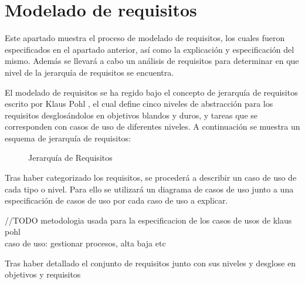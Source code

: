 \section{Modelado de requisitos}

Este apartado muestra el proceso de modelado de requisitos, los cuales fueron especificados en el apartado anterior, así como la explicación y especificación del mismo. Además se llevará a cabo un análisis de requisitos para determinar en que nivel de la jerarquía de requisitos se encuentra.
	
El modelado de requisitos se ha regido bajo el concepto de jerarquía de requisitos escrito por Klaus Pohl \cite{klauspohl}, el cual define cinco niveles de abstracción para los requisitos desglosándolos en objetivos blandos y duros, y tareas que se corresponden con casos de uso de diferentes niveles. A continuación se muestra un esquema de jerarquía de requisitos:
	
	\begin{figure}[H]
		\centering
		\caption{Jerarquía de Requisitos}\label{fig:esquemaObjetivos}
	\end{figure}

	Tras haber categorizado los requisitos, se procederá a describir un caso de uso de cada tipo o nivel. Para ello se utilizará un diagrama de casos de uso junto a una especificación de casos de uso por cada caso de uso a explicar.

	\vspace{5mm}
	//TODO
	metodologia usada para la especificacion de los casos de usos de klaus pohl\\
	
	caso de uso: gestionar procesos, alta baja etc
	
	\vspace{5mm}
	
	Tras haber detallado el conjunto de requisitos junto con sus niveles y desglose en objetivos y requisitos

	
	